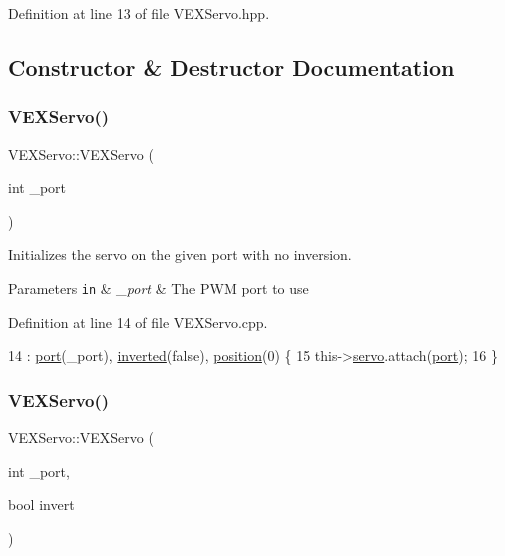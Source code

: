 Definition at line 13 of file V\+E\+X\+Servo.\+hpp.



\subsection{Constructor \& Destructor Documentation}
\mbox{\label{class_v_e_x_servo_ade28b71edfd878f947a63bbec722036b}} 
\subsubsection{\texorpdfstring{V\+E\+X\+Servo()}{VEXServo()}\hspace{0.1cm}{\footnotesize\ttfamily [1/2]}}
{\footnotesize\ttfamily V\+E\+X\+Servo\+::\+V\+E\+X\+Servo (\begin{DoxyParamCaption}\item[{int}]{\+\_\+port }\end{DoxyParamCaption})}



Initializes the servo on the given port with no inversion. 


\begin{DoxyParams}[1]{Parameters}
\mbox{\tt in}  & {\em \+\_\+port} & The P\+WM port to use \\
\hline
\end{DoxyParams}


Definition at line 14 of file V\+E\+X\+Servo.\+cpp.


\begin{DoxyCode}
14                             : \hyperlink{class_v_e_x_servo_a34333ff9091be5124f25597c95593291}{port}(\_port), \hyperlink{class_v_e_x_servo_a660e5b8a09906d86a4c7b6c7d88042c5}{inverted}(\textcolor{keyword}{false}), \hyperlink{class_v_e_x_servo_aa277013ab5c085b050b9a28f61e11e8b}{position}(0) \{
15     this->\hyperlink{class_v_e_x_servo_ab82f78aa9ea59ca24cec69e3e7563c3f}{servo}.attach(\hyperlink{class_v_e_x_servo_a34333ff9091be5124f25597c95593291}{port});
16 \}
\end{DoxyCode}
\mbox{\label{class_v_e_x_servo_a50cbd7885996e04d3c77b61b76d2ed91}} 
\subsubsection{\texorpdfstring{V\+E\+X\+Servo()}{VEXServo()}\hspace{0.1cm}{\footnotesize\ttfamily [2/2]}}
{\footnotesize\ttfamily V\+E\+X\+Servo\+::\+V\+E\+X\+Servo (\begin{DoxyParamCaption}\item[{int}]{\+\_\+port,  }\item[{bool}]{invert }\end{DoxyParamCaption})}



